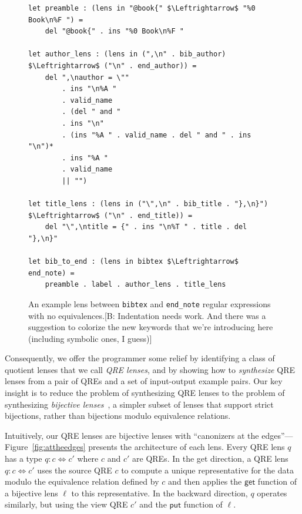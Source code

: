 \documentclass[acmsmall,review,anonymous]{acmart}
\newcommand{\FINISH}[3]{\ifdraft\textcolor{#1}{[#2: #3]}\fi}
\newcommand{\bcp}[1]{\FINISH{dkred}{B}{#1}}
\newcommand{\kw}[1]{\ensuremath{\mathsf{#1}}}
\newcommand{\bibtex}{\textsc{Bib}\TeX{}}
\newcommand{\get}{\ensuremath{\kw{get}}}
\newcommand{\lput}{\ensuremath{\kw{put}}}
\newcommand{\cd}[1]{\lstinline[backgroundcolor=\color{white}]$#1$}
\begin{document}
\begin{figure}[t]
\begin{lstlisting}
let preamble : (lens in "@book{" $\Leftrightarrow$ "%0 Book\n%F ") =
    del "@book{" . ins "%0 Book\n%F "

let author_lens : (lens in (",\n" . bib_author) $\Leftrightarrow$ ("\n" . end_author)) =
    del ",\nauthor = \""
        . ins "\n%A "
        . valid_name
        . (del " and "
        . ins "\n"
        . (ins "%A " . valid_name . del " and " . ins "\n")* 
        . ins "%A "
        . valid_name
        || "")

let title_lens : (lens in ("\",\n" . bib_title . "},\n}") $\Leftrightarrow$ ("\n" . end_title)) =
    del "\",\ntitle = {" . ins "\n%T " . title . del "},\n}"

let bib_to_end : (lens in bibtex $\Leftrightarrow$ end_note) =
    preamble . label . author_lens . title_lens
\end{lstlisting}
\caption{An example lens between \cd{bibtex} and \cd{end_note} regular
expressions with no equivalences.\bcp{Indentation needs work.  And there was
a suggestion to colorize the new keywords that we're introducing here
(including symbolic ones, I guess)}}
\label{fig:example-lens}
\end{figure}


Consequently, we offer the programmer some relief by identifying a class of
quotient lenses that we call {\em QRE lenses}, and by showing how to {\em synthesize}
QRE lenses from a pair of QREs and a set of input-output example pairs. Our key
insight is to reduce the problem of synthesizing QRE lenses to the problem of
synthesizing {\em bijective lenses}~\cite{optician}, a simpler subset of
lenses that support strict bijections, rather than bijections modulo
equivalence relations.

Intuitively, our QRE lenses are bijective lenses with ``canonizers at the
edges''---Figure~\ref{fig:attheedges} presents the architecture of each lens.
Every QRE lens $q$ has a type $q: c \Leftrightarrow c'$ where $c$ and $c'$ are QREs.
In the get direction, a QRE lens $q: c \Leftrightarrow c'$ uses the source
QRE $c$ to compute a unique representative for the data modulo the equivalence
relation defined by $c$ and then applies the $\get$ function of a bijective
lens $\ell$ to this representative. In the backward direction, $q$ operates
similarly,  but using the view QRE $c'$ and the $\lput$ function of $\ell$.
\end{document}
